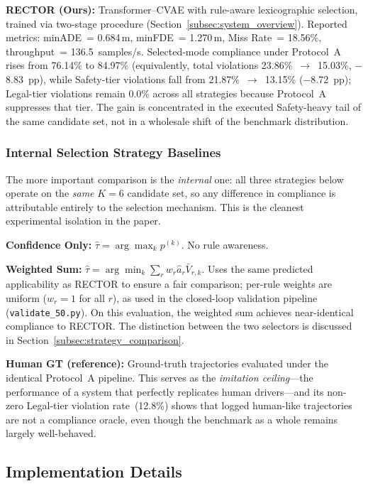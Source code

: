 \textbf{RECTOR (Ours):}  Transformer--CVAE with rule-aware lexicographic selection, trained via two-stage procedure (Section~\ref{subsec:system_overview}).  Reported metrics: minADE~= 0.684\,m, minFDE~= 1.270\,m, Miss Rate~= 18.56\%, throughput~= 136.5~samples/s.  Selected-mode compliance under Protocol~A rises from 76.14\% to 84.97\% (equivalently, total violations 23.86\%~$\rightarrow$~15.03\%, $-$8.83~pp), while Safety-tier violations fall from 21.87\%~$\rightarrow$~13.15\% ($-$8.72~pp); Legal-tier violations remain 0.0\% across all strategies because Protocol~A suppresses that tier.  The gain is concentrated in the executed Safety-heavy tail of the same candidate set, not in a wholesale shift of the benchmark distribution.

\subsubsection{Internal Selection Strategy Baselines}

The more important comparison is the \emph{internal} one: all three strategies below operate on the \emph{same} $K{=}6$ candidate set, so any difference in compliance is attributable entirely to the selection mechanism. This is the cleanest experimental isolation in the paper.

\textbf{Confidence Only:}  $\hat{\tau} = \arg\max_k p^{(k)}$.  No rule awareness.

\textbf{Weighted Sum:}  $\hat{\tau} = \arg\min_k \sum_r w_r \hat{a}_r \bar{V}_{r,k}$.  Uses the same predicted applicability as RECTOR to ensure a fair comparison; per-rule weights are uniform ($w_r{=}1$ for all $r$), as used in the closed-loop validation pipeline (\texttt{validate\_50.py}).  On this evaluation, the weighted sum achieves near-identical compliance to RECTOR.  The distinction between the two selectors is discussed in Section~\ref{subsec:strategy_comparison}.

\textbf{Human GT (reference):}  Ground-truth trajectories evaluated under the identical Protocol~A pipeline.  This serves as the \emph{imitation ceiling}---the performance of a system that perfectly replicates human drivers---and its non-zero Legal-tier violation rate~(12.8\%) shows that logged human-like trajectories are not a compliance oracle, even though the benchmark as a whole remains largely well-behaved.

\subsection{Implementation Details}
\label{subsec:implementation}


